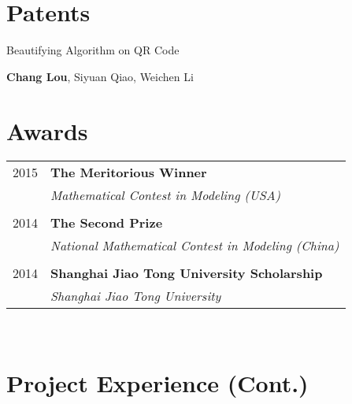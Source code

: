 \documentclass[10pt]{article} %
\begin{document}
{\begin{minipage}[t]{0.44\textwidth}
\section{Patents} 




{\raggedright\large Beautifying Algorithm on QR Code\\
[5pt]}
\normalsize{\textbf{Chang Lou}, Siyuan Qiao, Weichen Li}\\



\section{Awards} 

\begin{tabular}{rl}
2015	 & \textbf{The Meritorious Winner}\\
& \textit{Mathematical Contest in Modeling (USA)}\\ \\


2014 & \textbf{The Second Prize}\\
& \textit{National Mathematical Contest in Modeling (China)}\\ \\


2014 & \textbf{Shanghai Jiao Tong University Scholarship}\\
& \textit{Shanghai Jiao Tong University}
\end{tabular}\\[10pt]


\section{Project Experience (Cont.)} 


\end{minipage}}
\end{document}
